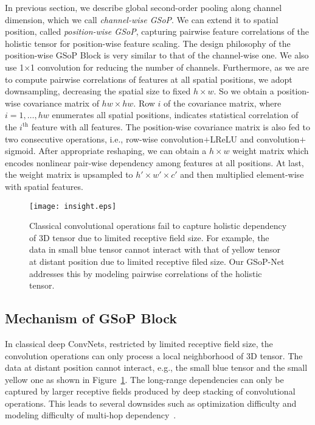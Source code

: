 \documentclass[10pt,twocolumn,letterpaper]{article}
\begin{document}
In previous section, we describe global second-order pooling along channel dimension, which we call \textit{channel-wise GSoP}. We can extend it to spatial position, called \textit{position-wise GSoP}, capturing pairwise feature correlations of the holistic tensor for position-wise feature scaling. 
The design philosophy of the position-wise GSoP Block is very similar to that of the channel-wise one. We also use 1$\times $1 convolution for reducing the number of channels. Furthermore, as we are to compute  pairwise  correlations of features at all spatial positions, we adopt downsampling, decreasing the spatial size to fixed $h\times w$. So we obtain a position-wise covariance matrix of  $hw\times hw$.  Row $i$ of the covariance matrix, where $i=1, \ldots, hw$ enumerates all spatial positions, indicates statistical correlation of the $i^{\mathrm{th}}$ feature with all features. The position-wise covariance matrix is also fed to two consecutive operations, i.e., row-wise  convolution$+$LReLU and convolution$+$sigmoid. After appropriate reshaping, we can obtain a  $h\times w$ weight matrix which encodes nonlinear pair-wise dependency among features  at all positions. At last, the weight matrix is upsampled to $h'\times w' \times c'$ and then multiplied  element-wise with spatial features.



\begin{figure}[tb]
	\centering
		\begin{minipage}[b]{0.7\linewidth}
			\centering
			\texttt{[image: insight.eps]}
	\end{minipage}
\caption{Classical convolutional operations fail to capture holistic dependency of 3D tensor due to limited receptive field size. For example, the data in  small blue tensor cannot interact with that of  yellow tensor at distant position due to limited receptive filed size. Our GSoP-Net addresses this by  modeling  pairwise correlations  of the holistic tensor.}
		\label{figure:insight}
\end{figure}



\subsection{Mechanism  of GSoP Block}\label{subsection-insight}

In classical deep ConvNets, restricted by limited receptive field size, the convolution operations can only process a local neighborhood of 3D tensor. The data at distant position cannot interact, e.g., the  small blue tensor and the small yellow one  as shown in Figure~\ref{figure:insight}. The long-range dependencies can only be captured by larger receptive fields produced by deep stacking of convolutional operations. This leads to  several downsides such as optimization difficulty and modeling difficulty of multi-hop dependency~\cite{Wang_2018_CVPR_nonlocal}.  
\end{document}
